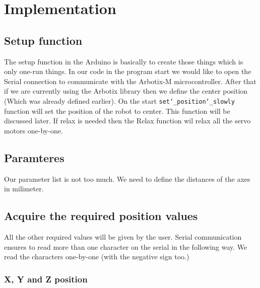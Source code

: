 \chapter{Implementation}

	\section{Setup function}
	
		\hspace{15pt}The setup function in the Arduino is basically to create those things which is only one-run things. In our code in the program start we would like to open the Serial connection to communicate with the Arbotix-M microcontroller. After that if we are currently using the Arbotix library then we define the center position (Which was already defined earlier). On the start \texttt{set\char`_position\char`_slowly} function will set the position of the robot to center. This function will be discussed later.
		If relax is needed then the Relax function wil relax all the servo motors one-by-one.
		
		

	\section{Paramteres}
	
		\hspace{15pt}Our parameter list is not too much. We need to define the distances of the axes in milimeter.
		
		

	\section{Acquire the required position values}
	
		\hspace{15pt}All the other required values will be given by the user.
		Serial communication ensures to read more than one character on the serial in the following way. We read the characters one-by-one (with the negative sign too.)
		
		\subsection{X, Y and Z position}
		
